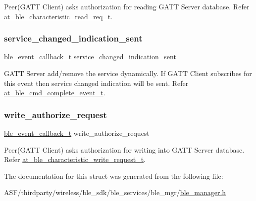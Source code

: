 Peer(\+G\+A\+T\+T Client) asks authorization for reading G\+A\+TT Server database. Refer \mbox{\hyperlink{structat__ble__characteristic__read__req__t}{at\+\_\+ble\+\_\+characteristic\+\_\+read\+\_\+req\+\_\+t}}. 

\mbox{\label{structble__gatt__server__event__cb_a1d1df8c125e687ee86e171a498951a59}} 
\subsubsection{\texorpdfstring{service\_changed\_indication\_sent}{service\_changed\_indication\_sent}}
{\footnotesize\ttfamily \mbox{\hyperlink{ble__manager_8h_a04ce4bb8cb8282f2762e3924b1773cc9}{ble\+\_\+event\+\_\+callback\+\_\+t}} service\+\_\+changed\+\_\+indication\+\_\+sent}



G\+A\+TT Server add/remove the service dynamically. If G\+A\+TT Client subscribes for this event then service changed indication will be sent. Refer \mbox{\hyperlink{structat__ble__cmd__complete__event__t}{at\+\_\+ble\+\_\+cmd\+\_\+complete\+\_\+event\+\_\+t}}. 

\mbox{\label{structble__gatt__server__event__cb_ae84f0ecb2ade7b0d22fd24370470fba3}} 
\subsubsection{\texorpdfstring{write\_authorize\_request}{write\_authorize\_request}}
{\footnotesize\ttfamily \mbox{\hyperlink{ble__manager_8h_a04ce4bb8cb8282f2762e3924b1773cc9}{ble\+\_\+event\+\_\+callback\+\_\+t}} write\+\_\+authorize\+\_\+request}



Peer(\+G\+A\+T\+T Client) asks authorization for writing into G\+A\+TT Server database. Refer \mbox{\hyperlink{structat__ble__characteristic__write__request__t}{at\+\_\+ble\+\_\+characteristic\+\_\+write\+\_\+request\+\_\+t}}. 



The documentation for this struct was generated from the following file\+:\begin{DoxyCompactItemize}
\item 
A\+S\+F/thirdparty/wireless/ble\+\_\+sdk/ble\+\_\+services/ble\+\_\+mgr/\mbox{\hyperlink{ble__manager_8h}{ble\+\_\+manager.\+h}}\end{DoxyCompactItemize}
